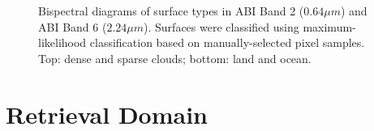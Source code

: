 \documentclass[12pt]{article}
\begin{document}
\begin{figure}[h!]
\begin{center}
{        }
    \end{center}
    \caption{Bispectral diagrams of surface types in ABI Band 2 ($0.64\mu m$) and ABI Band 6 ($2.24\mu m$). Surfaces were classified using maximum-likelihood classification based on manually-selected pixel samples. Top: dense and sparse clouds; bottom: land and ocean.}
    \label{domain_rgbs}
\end{figure}

\section{Retrieval Domain}


\end{document}
